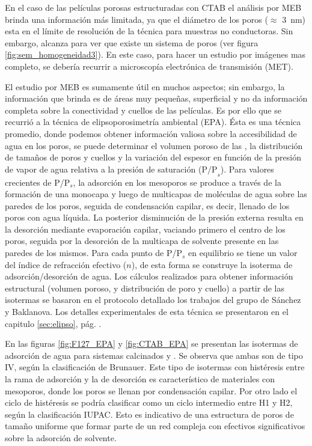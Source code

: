 		 En el caso de las películas porosas estructuradas con CTAB el análisis por MEB brinda una información más limitada, ya que el diámetro de los poros ($\approx$ \SI{3}{\nm}) esta en el límite de resolución de la técnica para muestras no conductoras. Sin embargo, alcanza para  ver que existe un sistema de poros (ver figura \ref{fig:sem_homogeneidad3}). En este caso, para hacer un estudio por imágenes mas completo, se debería recurrir a microscopía electrónica de transmisión (MET).

		 El estudio por MEB es sumamente útil en muchos aspectos; sin embargo, la información que brinda es de áreas muy pequeñas, superficial y no da información completa sobre la conectividad y cuellos de las películas. Es por ello que se recurrió a la técnica de elipsoporosimetría ambiental (EPA). Ésta es una técnica promedio, donde podemos obtener información valiosa sobre la accesibilidad de agua en los poros, se puede determinar el volumen poroso de las \pdm, la distribución de tamaños de poros y cuellos y la variación del espesor en función de la presión de vapor de agua relativa a la presión de saturación ($\text{P/P}_s$). Para valores crecientes de P/P$_s$, la adsorción en los mesoporos se produce a través de la formación de una monocapa y luego de multicapas de moléculas de agua sobre las paredes de los poros, seguida de condensación capilar, es decir, llenado de los poros con agua líquida. La posterior disminución de la presión externa resulta en la desorción mediante evaporación capilar, vaciando primero el centro de los poros, seguida por la desorción de la multicapa de solvente presente en las paredes de los mismos. Para cada punto de P/P$_s$ en equilibrio se tiene un valor del índice de refracción efectivo ($n$), de esta forma se construye la isoterma de adsorción/desorción de agua. Los cálculos realizados para obtener información estructural (volumen poroso, y distribución de poro y cuello) a partir de las isotermas se basaron en el protocolo detallado los trabajos del grupo de Sánchez y Baklanova\cite{Baklanov2000,Boissiere2005,Sakatani2006}. Los detalles experimentales de esta técnica se presentaron en el capitulo \ref{sec:elipso}, pág. \pageref{sec:elipso}.

		 En las figuras \ref{fig:F127_EPA} y \ref{fig:CTAB_EPA} se presentan las isotermas de adsorción de agua para sistemas calcinados \pdmF\space y \pdmC. Se observa que ambas son de tipo IV, según la clasificación de Brunauer\cite{Gregg1967,Violi2015,Fuertes2010}. Este tipo de isotermas con histéresis entre la rama de adsorción y la de desorción es característico de materiales con mesoporos, donde los poros se llenan por condensación capilar. Por otro lado el ciclo de histéresis se podría clasificar como un ciclo intermedio entre H1 y H2, según la clasificación IUPAC\cite{Thommes2015}. Esto es indicativo de una estructura de poros de tamaño uniforme que formar parte de un red compleja con efectivos significativos sobre la adsorción de solvente.\cite{Thommes2015,Gregg1967,Lowell2004,Sing1985}

